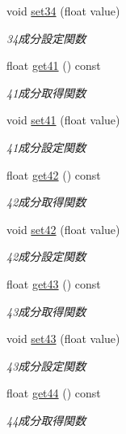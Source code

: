 \begin{DoxyCompactItemize}
void \mbox{\hyperlink{class_matrix_a7114f1252d78581637cbb5b06cff9b33}{set34}} (float value)
\begin{DoxyCompactList}\small\item\em 34成分設定関数 \end{DoxyCompactList}\item 
float \mbox{\hyperlink{class_matrix_a2afc1d50f54fc6f4a7088e4b6f016d84}{get41}} () const
\begin{DoxyCompactList}\small\item\em 41成分取得関数 \end{DoxyCompactList}\item 
void \mbox{\hyperlink{class_matrix_ae649f42548ca5617d8d1d47252a786f2}{set41}} (float value)
\begin{DoxyCompactList}\small\item\em 41成分設定関数 \end{DoxyCompactList}\item 
float \mbox{\hyperlink{class_matrix_a99f94d1870205989ca96695a430bd6d6}{get42}} () const
\begin{DoxyCompactList}\small\item\em 42成分取得関数 \end{DoxyCompactList}\item 
void \mbox{\hyperlink{class_matrix_a397c7b3f9292c224f86cdf0cb4d8e46d}{set42}} (float value)
\begin{DoxyCompactList}\small\item\em 42成分設定関数 \end{DoxyCompactList}\item 
float \mbox{\hyperlink{class_matrix_aa72989c74eeeb117ba6dc4b8cc7af619}{get43}} () const
\begin{DoxyCompactList}\small\item\em 43成分取得関数 \end{DoxyCompactList}\item 
void \mbox{\hyperlink{class_matrix_a724ee3aa5cfc17cea02fe474d807c0cc}{set43}} (float value)
\begin{DoxyCompactList}\small\item\em 43成分設定関数 \end{DoxyCompactList}\item 
float \mbox{\hyperlink{class_matrix_a891abd390e49f286709c5962877395d8}{get44}} () const
\begin{DoxyCompactList}\small\item\em 44成分取得関数 \end{DoxyCompactList}\item 

\end{DoxyCompactItemize}
